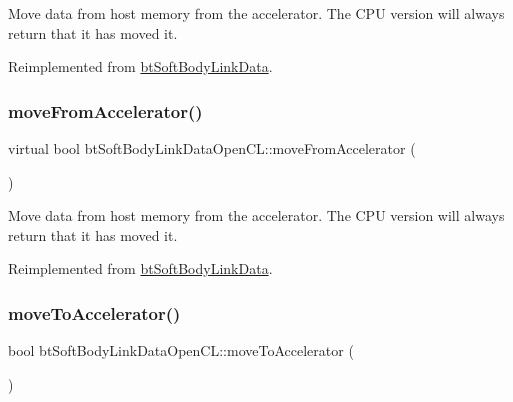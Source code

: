 Move data from host memory from the accelerator. The C\+PU version will always return that it has moved it. 

Reimplemented from \hyperlink{classbtSoftBodyLinkData_a5018ad236aae590df94bca63c1ad7ee1}{bt\+Soft\+Body\+Link\+Data}.

\mbox{\label{classbtSoftBodyLinkDataOpenCL_a67152548f633d131fbdb33d323f701db}} 
\subsubsection{\texorpdfstring{move\+From\+Accelerator()}{moveFromAccelerator()}\hspace{0.1cm}{\footnotesize\ttfamily [2/2]}}
{\footnotesize\ttfamily virtual bool bt\+Soft\+Body\+Link\+Data\+Open\+C\+L\+::move\+From\+Accelerator (\begin{DoxyParamCaption}{ }\end{DoxyParamCaption})\hspace{0.3cm}{\ttfamily [virtual]}}

Move data from host memory from the accelerator. The C\+PU version will always return that it has moved it. 

Reimplemented from \hyperlink{classbtSoftBodyLinkData_a5018ad236aae590df94bca63c1ad7ee1}{bt\+Soft\+Body\+Link\+Data}.

\mbox{\label{classbtSoftBodyLinkDataOpenCL_a6957608260f4a848712de1ad0b8f863f}} 
\subsubsection{\texorpdfstring{move\+To\+Accelerator()}{moveToAccelerator()}\hspace{0.1cm}{\footnotesize\ttfamily [1/2]}}
{\footnotesize\ttfamily bool bt\+Soft\+Body\+Link\+Data\+Open\+C\+L\+::move\+To\+Accelerator (\begin{DoxyParamCaption}{ }\end{DoxyParamCaption})\hspace{0.3cm}{\ttfamily [virtual]}}

